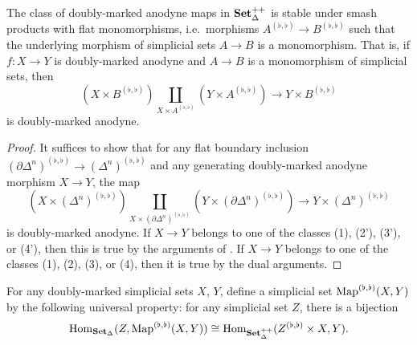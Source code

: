 \documentclass[main.tex]{subfiles}
\begin{document}
\begin{lemma}
  \label{lemma:smash_product_of_doubly-marked_anodyne_and_monic_is_doubly-marked_anodyne}
  The class of doubly-marked anodyne maps in $\mathbf{Set}_{\Delta}^{++}$ is stable under smash products with flat monomorphisms, i.e.\ morphisms $A^{(\flat, \flat)} \to B^{(\flat, \flat)}$ such that the underlying morphism of simplicial sets $A \to B$ is a monomorphism. That is, if $f\colon X \to Y$ is doubly-marked anodyne and $A \to B$ is a monomorphism of simplicial sets, then
  \begin{equation*}
    (X \times B^{(\flat, \flat)}) \coprod_{X \times A^{(\flat, \flat)}} (Y \times A^{(\flat, \flat)}) \to Y \times B^{(\flat, \flat)}
  \end{equation*}
  is doubly-marked anodyne.
\end{lemma}
\begin{proof}
  It suffices to show that for any flat boundary inclusion $(\partial \Delta^{n})^{(\flat, \flat)} \to (\Delta^{n})^{(\flat, \flat)}$ and any generating doubly-marked anodyne morphism $X \to Y$, the map
  \begin{equation*}
    (X \times (\Delta^{n})^{(\flat, \flat)}) \coprod_{X \times (\partial \Delta^{n})^{(\flat, \flat)}} (Y \times (\partial\Delta^{n})^{(\flat, \flat)}) \to Y \times (\Delta^{n})^{(\flat, \flat)}
  \end{equation*}
  is doubly-marked anodyne. If $X \to Y$ belongs to one of the classes (1), (2'), (3'), or (4'), then this is true by the arguments of \cite[Prop.\ 3.1.2.3]{highertopostheory}. If $X \to Y$ belongs to one of the classes (1), (2), (3), or (4), then it is true by the dual arguments.
\end{proof}

\begin{definition}
  For any doubly-marked simplicial sets $X$, $Y$, define a simplicial set $\mathrm{Map}^{(\flat, \flat)}(X, Y)$ by the following universal property: for any simplicial set $Z$, there is a bijection
  \begin{equation*}
    \mathrm{Hom}_{\mathbf{Set}_{\Delta}}(Z, \mathrm{Map}^{(\flat, \flat)}(X, Y)) \cong \mathrm{Hom}_{\mathbf{Set}_{\Delta}^{++}}(Z^{(\flat, \flat)} \times X, Y).
  \end{equation*}
\end{definition}
\end{document}
